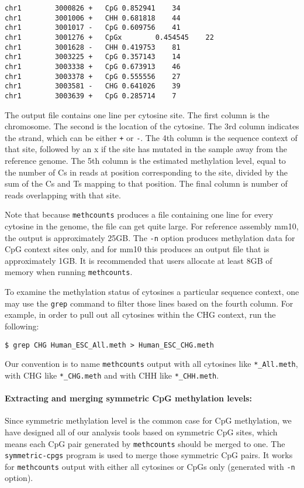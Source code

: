 \documentclass[10pt]{article}
\newcommand{\prog}[1]{\texttt{#1}}
\newcommand{\fn}[1]{\texttt{#1}}
\newcommand{\lit}[1]{\texttt{#1}}
\newcommand{\op}[1]{\texttt{#1}}
\begin{document}
{\small{%
\begin{verbatim}
chr1		3000826	+	CpG	0.852941	34
chr1		3001006	+	CHH	0.681818	44
chr1		3001017	-	CpG	0.609756	41
chr1		3001276	+	CpGx		0.454545	22
chr1		3001628	-	CHH	0.419753	81
chr1		3003225	+	CpG	0.357143	14
chr1		3003338	+	CpG	0.673913	46
chr1		3003378	+	CpG	0.555556	27
chr1		3003581	-	CHG	0.641026	39
chr1		3003639	+	CpG	0.285714	7
\end{verbatim}%
}}

The output file contains one line per cytosine site. The first column is
the chromosome. The second is the location of the cytosine. The 3rd column indicates the strand, which can be either \lit{+} or \lit{-}. The 4th
column is the sequence context of that site, followed by an x if the
site has mutated in the sample away from the reference genome. The 5th 
column is the estimated methylation level, equal to the number of Cs in 
reads at position corresponding to the site, divided by the sum of the Cs 
and Ts mapping to that position. The final column is number of reads
overlapping with that site.


Note that because \prog{methcounts} produces a file containing one line
for every cytosine in the genome, the file can get quite large. For
reference assembly mm10, the output is approximately 25GB. The \op{-n}
option produces methylation data for CpG context sites only, and for
mm10 this produces an output file that is approximately 1GB. It is
recommended that users allocate at least 8GB of memory when running
\prog{methcounts}.

To examine the methylation status of cytosines a particular sequence
context, one may use the \prog{grep} command to filter those lines
based on the fourth column. For example, in order to pull out all
cytosines within the CHG context, run the following:

\begin{verbatim}
$ grep CHG Human_ESC_All.meth > Human_ESC_CHG.meth
\end{verbatim}

Our convention is to name \prog{methcounts} output with all cytosines
like \fn{*\_All.meth}, with CHG like \fn{*\_CHG.meth} and
with CHH like \fn{*\_CHH.meth}.

\paragraph{Extracting and merging symmetric CpG methylation levels:}
\label{sec:symmetric-cpg}
Since symmetric methylation level is the common case for CpG methylation,
we have designed all of our analysis tools based on symmetric CpG sites, 
which means each CpG pair generated by \texttt{methcounts} should be
merged to one. The \texttt{symmetric-cpgs} program is used to merge those
symmetric CpG pairs. It works for \texttt{methcounts} output with either
all cytosines or CpGs only (generated with \texttt{-n} option).
\end{document}
